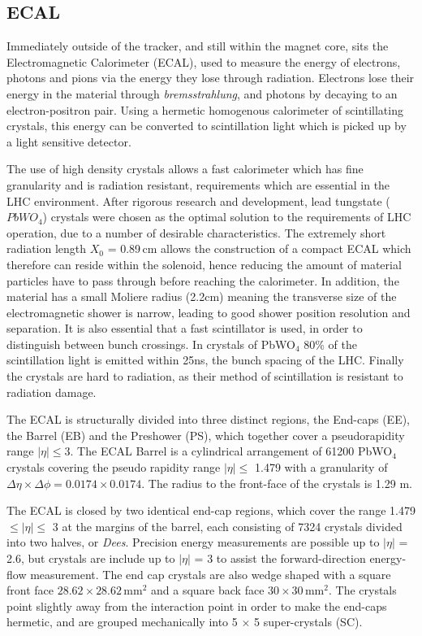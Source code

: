 \subsection{ECAL}

Immediately outside of the tracker, and still within the magnet core, sits the Electromagnetic Calorimeter (ECAL), used to measure the energy of electrons, photons and pions via the energy they lose through radiation. Electrons lose their energy in the material through \textit{bremsstrahlung}, and photons by decaying to an electron-positron pair. Using a hermetic homogenous calorimeter of scintillating crystals, this energy can be converted to scintillation light which is picked up by a light sensitive detector. 

The use of high density crystals allows a fast calorimeter which has fine granularity and is radiation resistant, requirements which are essential in the LHC environment. After rigorous research and development, lead tungstate ($PbWO_{4}$) crystals were chosen as the optimal solution to the requirements of LHC operation, due to a number of desirable characteristics. The extremely short radiation length $X_{0}$ = 0.89\,cm allows the construction of a compact ECAL which therefore can reside within the solenoid, hence reducing the amount of material particles have to pass through before reaching the calorimeter. In addition, the material has a small Moliere radius (2.2cm) meaning the transverse size of the electromagnetic shower is narrow, leading to good shower position resolution and separation. It is also essential that a fast scintillator is used, in order to distinguish between bunch crossings. In crystals of PbWO$_{4}$ 80\% of the scintillation light is emitted within 25ns, the bunch spacing of the LHC. Finally the crystals are hard to radiation, as their method of scintillation is resistant to radiation damage. 

The ECAL is structurally divided into three distinct regions, the End-caps (EE), the Barrel (EB) and the Preshower (PS), which together cover a pseudorapidity range $|\eta| \leq$3. The ECAL Barrel is a cylindrical arrangement of 61200 PbWO$_{4}$ crystals covering the pseudo rapidity range $|\eta| \leq$ 1.479 with a granularity of $\Delta \eta \times \Delta \phi = 0.0174 \times 0.0174$. The radius to the front-face of the crystals is 1.29 m. 


The ECAL is closed by two identical end-cap regions, which cover the range 1.479 $\leq |\eta| \leq$ 3 at the margins of the barrel, each consisting of 7324 crystals divided into two halves, or \textit{Dees}. Precision energy measurements are possible up to $|\eta|$ = 2.6, but crystals are include up to $|\eta|$ = 3 to assist the forward-direction energy-flow measurement. The end cap crystals are also wedge shaped with a square front face $28.62 \times 28.62$\,mm$^{2}$ and a square back face $30 \times 30$\,mm$^{2}$. The crystals point slightly away from the interaction point in order to make the end-caps hermetic, and are grouped mechanically into 5 $\times$ 5 super-crystals (SC). 

